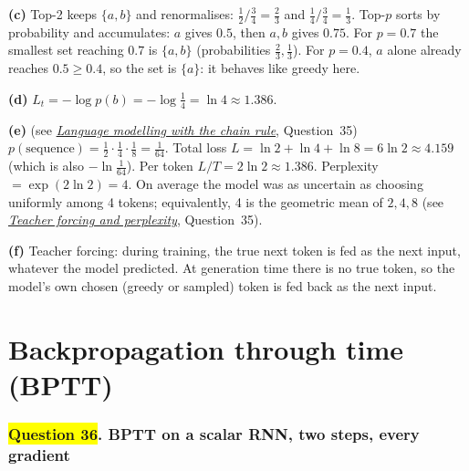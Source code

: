 \documentclass[12pt,a4paper]{article}
\newcommand{\seeconcept}[3]{(see \hyperref[#1]{\textit{#2}}, Question~#3)}
\newcommand{\hlq}[1]{{\setlength{\fboxsep}{1.5pt}\colorbox{yellow}{#1}}}
\begin{document}
\textbf{(c)} Top-2 keeps $\{a,b\}$ and renormalises: $\tfrac12/\tfrac34=\tfrac23$ and $\tfrac14/\tfrac34=\tfrac13$. Top-$p$ sorts by probability and accumulates: $a$ gives $0.5$, then $a,b$ gives $0.75$. For $p=0.7$ the smallest set reaching $0.7$ is $\{a,b\}$ (probabilities $\tfrac23,\tfrac13$). For $p=0.4$, $a$ alone already reaches $0.5\ge0.4$, so the set is $\{a\}$: it behaves like greedy here.

\textbf{(d)} $L_t=-\log p(b)=-\log\tfrac14=\ln4\approx1.386$.

\textbf{(e)} \seeconcept{c:lmchain}{Language modelling with the chain rule}{35} $p(\text{sequence})=\tfrac12\cdot\tfrac14\cdot\tfrac18=\tfrac1{64}$. Total loss $L=\ln2+\ln4+\ln8=6\ln2\approx4.159$ (which is also $-\ln\tfrac1{64}$). Per token $L/T=2\ln2\approx1.386$. Perplexity $=\exp(2\ln2)=4$. On average the model was as uncertain as choosing uniformly among 4 tokens; equivalently, 4 is the geometric mean of $2,4,8$ \seeconcept{c:teacher}{Teacher forcing and perplexity}{35}.

\textbf{(f)} Teacher forcing: during training, the true next token is fed as the next input, whatever the model predicted. At generation time there is no true token, so the model's own chosen (greedy or sampled) token is fed back as the next input.
\part{Backpropagation through time (BPTT)}

\section[Question 36. BPTT on a scalar RNN, two steps, every gradient]{\hlq{Question 36}. BPTT on a scalar RNN, two steps, every gradient}
\end{document}

